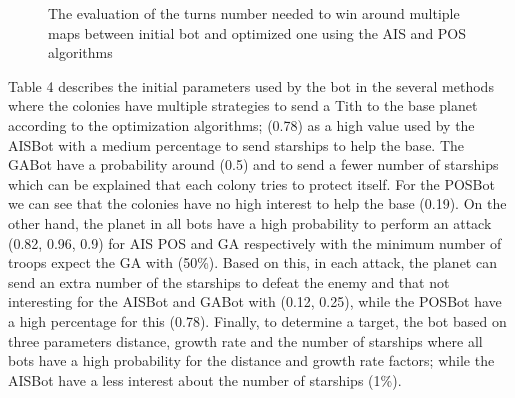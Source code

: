 \documentclass[]{interact}
\theoremstyle{plain}%
\theoremstyle{definition}
\theoremstyle{remark}
\begin{document}
\begin{figure}
\begin{center}
\end{center}
\caption{The evaluation of the turns number needed to win around multiple maps between initial bot and optimized one using the AIS and POS algorithms}
\end{figure}


Table 4 describes the initial parameters used by the bot in the several methods where the colonies have multiple strategies to send a Tith to the base planet according to the optimization algorithms; (0.78) as a high value used by the AISBot with a medium percentage to send starships to help the base. The GABot have a probability around (0.5) and to send a fewer number of starships which can be explained that each colony tries to protect itself. For the POSBot we can see that the colonies have no high interest to help the base (0.19). On the other hand, the planet in all bots have a high probability to perform an attack (0.82, 0.96, 0.9) for AIS POS and GA respectively with the minimum number of troops expect the GA with (50\%). Based on this, in each attack, the planet can send an extra number of the starships to defeat the enemy and that not interesting for the AISBot and GABot with (0.12, 0.25), while the POSBot have a high percentage for this (0.78). Finally, to determine a target, the bot based on three parameters distance, growth rate and the number of starships where all bots have a high probability for the distance and growth rate factors; while the AISBot have a less interest about the number of starships (1\%).\\
\end{document}
